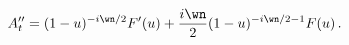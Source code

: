 \begin{equation}
A_t'' = (1-u)^{-i \wn/2} F'(u) + {i\wn \over 2} (1-u)^{-i \wn/2 -1} F(u)  \, .
\label{eq_sol_derivative}
\end{equation}

